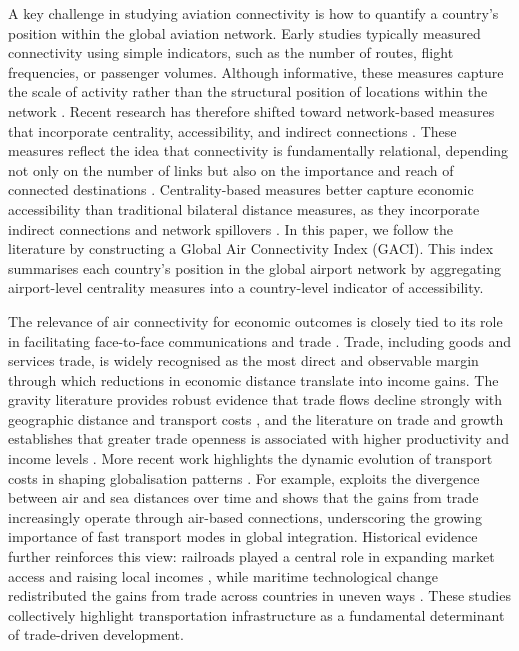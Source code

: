 A key challenge in studying aviation connectivity is how to quantify a
country's position within the global aviation network. Early studies
typically measured connectivity using simple indicators, such as the number
of routes, flight frequencies, or passenger volumes. Although informative,
these measures capture the scale of activity rather than the structural
position of locations within the network \citep{Burghouwt_2013}. Recent
research has therefore shifted toward network-based measures that incorporate
centrality, accessibility, and indirect connections \citep{Wandelt_2025}.
These measures reflect the idea that connectivity is fundamentally
relational, depending not only on the number of links but also on the
importance and reach of connected destinations \citep{Cheung_2020}.
Centrality-based measures better capture economic accessibility than
traditional bilateral distance measures, as they incorporate indirect
connections and network spillovers \citep{Zhou_2021}. In this paper, we
follow the literature \citep{Cheung_2020} by constructing a Global Air
Connectivity Index (GACI). This index summarises each country's position in
the global airport network by aggregating airport-level centrality measures
into a country-level indicator of accessibility.

The relevance of air connectivity for economic outcomes is closely tied to
its role in facilitating face-to-face communications and trade
\citep{Sun_2024}. Trade, including goods and services trade, is widely
recognised as the most direct and observable margin through which reductions
in economic distance translate into income gains. The gravity literature
provides robust evidence that trade flows decline strongly with geographic
distance and transport costs \citep{Redding_2004,Zheng_2020}, and the
literature on trade and growth establishes that greater trade openness is
associated with higher productivity and income levels \citep{Alcala_2004}.
More recent work highlights the dynamic evolution of transport costs in
shaping globalisation patterns \citep{Amico_2026}. For example,
\citet{Feyrer_2019} exploits the divergence between air and sea distances
over time and shows that the gains from trade increasingly operate through
air-based connections, underscoring the growing importance of fast transport
modes in global integration. Historical evidence further reinforces this
view: railroads played a central role in expanding market access and raising
local incomes \citep{Donaldson_2016,Donaldson_2018}, while maritime
technological change redistributed the gains from trade across countries in
uneven ways \citep{Pascali_2017}. These studies collectively highlight
transportation infrastructure as a fundamental determinant of trade-driven
development.

